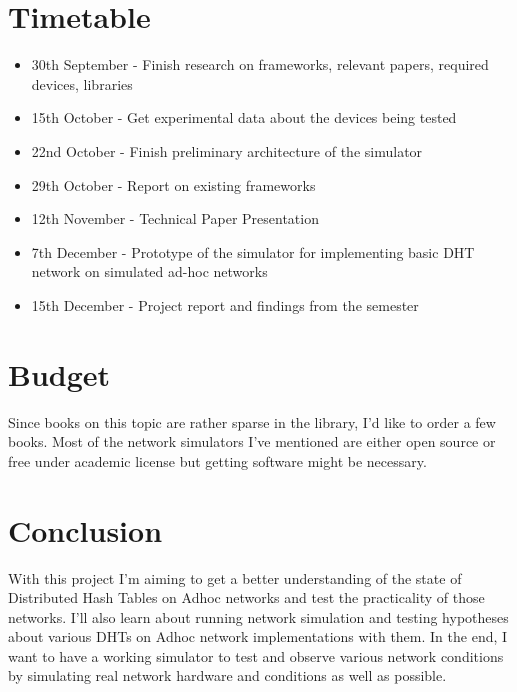 \documentclass[a4paper,10pt]{article}
\begin{document}

\section*{Timetable}
\begin{itemize}
 \item 30th September - Finish research on frameworks, relevant papers, required devices, libraries
 \item 15th October - Get experimental data about the devices being tested
 \item 22nd October - Finish preliminary architecture of the simulator
 \item 29th October - Report on existing frameworks 
 \item 12th November - Technical Paper Presentation
 \item 7th December - Prototype of the simulator for implementing basic DHT network on simulated ad-hoc networks
 \item 15th December - Project report and findings from the semester
\end{itemize}

\section*{Budget}
Since books on this topic are rather sparse in the library, I'd like to order a few books. Most of the network simulators I've mentioned are either open source or free under academic license but getting software might be necessary.

\section*{Conclusion}
With this project I'm aiming to get a better understanding of the state of Distributed Hash Tables on Adhoc networks and test the practicality of those networks. I'll also learn about running network simulation and testing hypotheses about various DHTs on Adhoc network implementations with them. In the end, I want to have a working simulator to test and observe various network conditions by simulating real network hardware and conditions as well as possible.
{}

\end{document}
